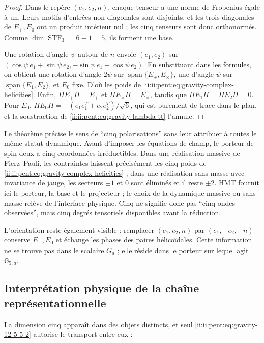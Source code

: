 \begin{proof}
Dans le repère \((e_1,e_2,n)\), chaque tenseur a une norme de Frobenius égale à un.
Leurs motifs d’entrées non diagonales sont disjoints, et les trois diagonales
de \(E_+,E_0\) ont un produit intérieur nul ; les cinq tenseurs
sont donc orthonormés. Comme \(\dim\operatorname{STF}_3=6-1=5\), ils forment une base.

Une rotation d’angle \(\psi\) autour de \(n\) envoie
\((e_1,e_2)\) sur
\((\cos\psi\,e_1+\sin\psi\,e_2,
-\sin\psi\,e_1+\cos\psi\,e_2)\). En substituant dans les formules, on obtient
une rotation d’angle \(2\psi\) sur
\(\operatorname{span}\{E_+,E_\times\}\), une d’angle \(\psi\) sur
\(\operatorname{span}\{E_1,E_2\}\), et \(E_0\) fixe. D’où les poids de
\eqref{ii:ii:pent:eq:gravity-complex-helicities}. Enfin,
\(\Pi E_{+}\Pi=E_+\) et \(\Pi E_\times\Pi=E_\times\), tandis que
\(\Pi E_1\Pi=\Pi E_2\Pi=0\). Pour \(E_0\),
\(\Pi E_0\Pi=-(e_1e_1^T+e_2e_2^T)/\sqrt6\), qui est purement de trace dans
le plan, et la soustraction de \eqref{ii:ii:pent:eq:gravity-lambda-tt} l’annule.
\end{proof}

Le théorème précise le sens de ``cinq polarisations'' sans leur attribuer
à toutes le même statut dynamique. Avant d’imposer les équations de champ,
le porteur de spin deux a cinq coordonnées irréductibles. Dans une
réalisation massive de Fierz--Pauli, les contraintes laissent précisément
les cinq poids de \eqref{ii:ii:pent:eq:gravity-complex-helicities} ; dans une réalisation
sans masse avec invariance de jauge, les secteurs \(\pm1\) et \(0\) sont éliminés et
il reste \(\pm2\). HMT fournit ici le porteur, la base et le projecteur ;
le choix de la dynamique massive ou sans masse relève de l’interface
physique. Cinq ne signifie donc pas ``cinq ondes observées'', mais cinq
degrés tensoriels disponibles avant la réduction.

L’orientation reste également visible : remplacer
\((e_1,e_2,n)\) par \((e_1,-e_2,-n)\) conserve \(E_+,E_0\) et échange
les phases des paires hélicoïdales. Cette information ne se trouve pas dans le
scalaire \(G_a\) ; elle réside dans le porteur sur lequel agit
\(\mathbb G_{5,a}\).

\subsection{Interprétation physique de la chaîne représentationnelle}

La dimension cinq apparaît dans des objets distincts, et seul
\eqref{ii:ii:pent:eq:gravity-12-5-5-2} autorise le transport entre eux :

